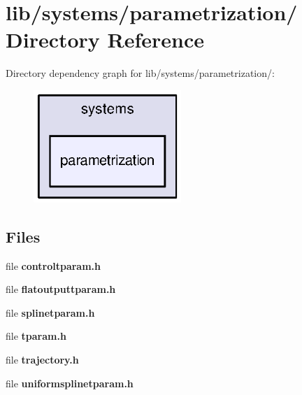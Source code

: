\section{lib/systems/parametrization/ \-Directory \-Reference}
\label{dir_561ed80c3b26cda5d11c33cb1fa4b6e6}
\-Directory dependency graph for lib/systems/parametrization/\-:\nopagebreak
\begin{figure}[H]
\begin{center}
\leavevmode
\includegraphics[width=158pt]{dir_561ed80c3b26cda5d11c33cb1fa4b6e6_dep}
\end{center}
\end{figure}
\subsection*{\-Files}
\begin{DoxyCompactItemize}
\item 
file {\bf controltparam.\-h}
\item 
file {\bf flatoutputtparam.\-h}
\item 
file {\bf splinetparam.\-h}
\item 
file {\bf tparam.\-h}
\item 
file {\bf trajectory.\-h}
\item 
file {\bf uniformsplinetparam.\-h}
\end{DoxyCompactItemize}
